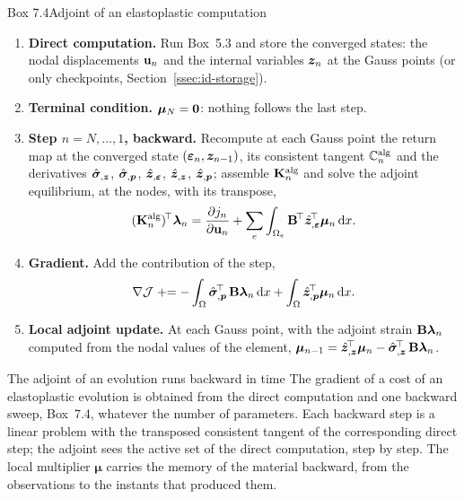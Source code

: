 \begin{gbox}{Box 7.4\quad Adjoint of an elastoplastic computation}
%
\begin{enumerate}[label=\textbf{\arabic*.},leftmargin=1.6em]
  \item \textbf{Direct computation.} Run Box~5.3 and store the converged states:
  the nodal displacements $\mathbf{u}_n$ and the internal variables $\bm{z}_n$ at the
  Gauss points (or only checkpoints, Section~\ref{ssec:id-storage}).
  \item \textbf{Terminal condition.} $\boldsymbol\mu_N=\bm{0}$: nothing follows the
  last step.
  \item \textbf{Step $n=N,\dots,1$, backward.} Recompute at each Gauss point the
  return map at the converged state $(\bm{\varepsilon}_n,\bm{z}_{n-1})$, its consistent tangent
  $\mathbb{C}^{\mathrm{alg}}_n$ and the derivatives $\hat{\bm{\sigma}}_{,\bm{z}}$, $\hat{\bm{\sigma}}_{,\bm{p}}$, $\hat{\bm{z}}_{,\bm{\varepsilon}}$,
  $\hat{\bm{z}}_{,\bm{z}}$, $\hat{\bm{z}}_{,\bm{p}}$; assemble $\mathbf{K}^{\mathrm{alg}}_n$ and solve the
  adjoint equilibrium, at the nodes, with its transpose,
  \[
    (\mathbf{K}^{\mathrm{alg}}_n)^{\!\top}\boldsymbol\lambda_n=\frac{\partial j_n}{\partial\mathbf{u}_n}
    +\sum_e\int_{\Omega_e}\mathbf{B}^{\!\top}\hat{\bm{z}}_{,\bm{\varepsilon}}^{\!\top}\boldsymbol\mu_n\,\mathrm{d} x .
  \]
  \item \textbf{Gradient.} Add the contribution of the step,
  \[
    \nabla\mathcal J\mathrel{+}=-\int_\Omega\hat{\bm{\sigma}}_{,\bm{p}}^{\!\top}\,\mathbf{B}\boldsymbol\lambda_n\,\mathrm{d} x
    +\int_\Omega\hat{\bm{z}}_{,\bm{p}}^{\!\top}\boldsymbol\mu_n\,\mathrm{d} x .
  \]
  \item \textbf{Local adjoint update.} At each Gauss point, with the adjoint strain
  $\mathbf{B}\boldsymbol\lambda_n$ computed from the nodal values of the element,
  $\boldsymbol\mu_{n-1}=\hat{\bm{z}}_{,\bm{z}}^{\!\top}\boldsymbol\mu_n-\hat{\bm{\sigma}}_{,\bm{z}}^{\!\top}\,\mathbf{B}\boldsymbol\lambda_n$.
\end{enumerate}
\end{gbox}

\begin{gbox}{The adjoint of an evolution runs backward in time}\label{prop:id-backward}
The gradient of a cost of an elastoplastic evolution is obtained from the direct
computation and one backward sweep, Box~7.4, whatever the number of parameters.
Each backward step is a linear problem with the transposed consistent tangent of
the corresponding direct step; the adjoint sees the active set of the direct
computation, step by step. The local multiplier $\boldsymbol\mu$ carries the memory
of the material backward, from the observations to the instants that produced
them.
\end{gbox}
